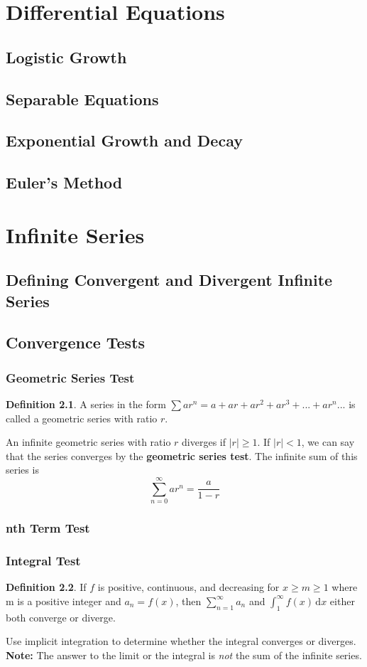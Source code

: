 \documentclass[letterpaper]{report}
\theoremstyle{definition}
\newtheorem{definition}{Definition}
\begin{document}
\chapter{Differential Equations}
\section{Logistic Growth}
\section{Separable Equations}
\section{Exponential Growth and Decay}
\section{Euler's Method}

\chapter{Infinite Series}
\section{Defining Convergent and Divergent Infinite Series}
\section{Convergence Tests}
\subsection{Geometric Series Test}
\begin{definition}
A series in the form $\sum{ar^n} = a + ar + ar^2 + ar^3 + ... + ar^n ...$
is called a geometric series with ratio $r$.
\end{definition}
An infinite geometric series with ratio $r$ diverges if $|r|\geq1$.
If $|r|<1$, we can say that the series converges by the 
\textbf{geometric series test}. The infinite sum of this series is
\[ \sum_{n=0}^\infty ar^n = \frac{a}{1-r} \]
\subsection{nth Term Test}
\subsection{Integral Test}
\begin{definition}
If $f$ is positive, continuous, and decreasing for $x\geq{}m\geq{}1$ where
m is a positive integer and $a_n=f(x)$, then $\sum_{n=1}^\infty a_n$ and
$\int_1^\infty f(x) \, \mathrm{d}x$ either both converge or diverge.
\end{definition}
Use implicit integration to determine whether the integral converges or diverges.
\textbf{Note:} The answer to the limit or the integral is \textit{not} the 
sum of the infinite series.
\end{document}
